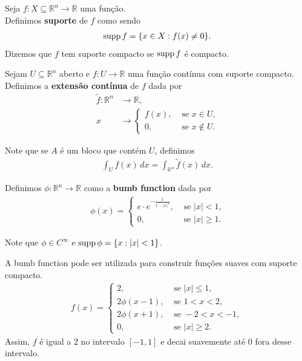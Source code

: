 \begin{definition}[Suporte]
  Seja $f:X\subseteq\mathbb{R}^{n}\to\mathbb{R}$ uma função.\\
  Definimos  \textbf{suporte} de $f$ como sendo
  \begin{align*}
    \operatorname{supp} f=\{x\in X:f(x)\neq 0\}.
  \end{align*}
  Dizemos que $f$ tem suporte compacto se $\operatorname{supp} f$ é compacto. 
\end{definition}
\begin{definition}
  Sejam $U\subseteq\mathbb{R}^{n}$ aberto e $f:U\to\mathbb{R}$ uma função contínua com suporte compacto. Definimos a \textbf{extensão contínua} de $f$ dada por
  \begin{align*}
    \tilde{f}:\mathbb{R}^{n}&\to\mathbb{R},\\
                           x&\to \begin{cases}
                             f(x), &\text{ se } x\in U \text{,} \\
                            0, &\text{ se } x\notin U.
                           \end{cases}
  \end{align*}
\end{definition}
Note que se $A$ é um bloco que contém $U$, definimos
\begin{align*}
  \int_{U}f(x)\,dx=\int_{\mathbb{R}^{n}}\tilde{f}(x)\,dx.
\end{align*}
\begin{definition}
  Definimos $\phi:\mathbb{R}^{n}\to\mathbb{R}$ como a \textbf{bumb function} dada por
  \begin{align*}
    \phi(x)=\begin{cases}
      e\cdot e^{-\frac{1}{1-|x|^{2}}}, &\text{ se } |x|<1 \text{,} \\
      0, &\text{ se } |x|\geq 1.
    \end{cases}
  \end{align*}
  \begin{center}
      
  \end{center}
  Note que $\phi\in C^{\infty}$ e $\operatorname{supp} \phi=\{x:|x|<1\}$.
\end{definition}
\begin{example}\label{ex:bumb-function}
  A bumb function pode ser utilizada para construir funções suaves com suporte compacto.
  \begin{align*}
    f(x)=\begin{cases}
      2, &\text{ se } |x|\leq 1,\\
      2\phi(x-1), &\text{ se } 1<x<2,\\
      2\phi(x+1), &\text{ se } -2<x<-1,\\
      0, &\text{ se } |x|\geq 2.
    \end{cases}
  \end{align*}
  Assim, $f$ é igual a $2$ no intervalo $[-1,1]$ e decai suavemente até $0$ fora desse intervalo.
  \begin{center}
    
  \end{center}
\end{example}
